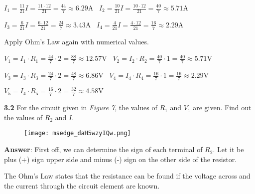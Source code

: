 \documentclass{article}
\begin{document}
{\vspace{4mm}

{\Large $\displaystyle \boxed{I_1 = \frac{11}{21}I = \frac{11\cdot 12}{21} = \frac{44}{7} \approx 6.29 \text{A}}$} \ {\Large $\displaystyle \boxed{I_2 = \frac{10}{21}I = \frac{10\cdot 12}{21} = \frac{40}{7}  \approx 5.71 \text{A}}$}

{\Large $\displaystyle \boxed{I_3 = \frac{6}{21}I = \frac{6\cdot 12}{21} = \frac{24}{7}  \approx 3.43 \text{A}}$} \ {\Large $\displaystyle \boxed{I_4 = \frac{4}{21}I = \frac{4\cdot 12}{21} = \frac{16}{7}  \approx 2.29 \text{A}}$}

\vspace{4mm}

{\Large Apply Ohm's Law again with numerical values.}

\vspace{4mm}

{\Large $\displaystyle \boxed{V_1 = I_1\cdot R_1 = \frac{44}{7} \cdot 2 = \frac{88}{7} \approx 12.57 \text{V}}$} \ {\Large $\displaystyle \boxed{V_2 = I_2\cdot R_2 = \frac{40}{7} \cdot 1 = \frac{40}{7} \approx 5.71 \text{V}}$}

{\Large $\displaystyle \boxed{V_3 = I_3\cdot R_3 = \frac{24}{7} \cdot 2 = \frac{48}{7} \approx 6.86 \text{V}}$} \ {\Large $\displaystyle \boxed{V_4 = I_4\cdot R_4 = \frac{16}{7} \cdot 1 = \frac{16}{7} \approx 2.29 \text{V}}$}

{\Large $\displaystyle \boxed{V_5 = I_4\cdot R_5 = \frac{16}{7} \cdot 2 = \frac{32}{7} \approx 4.58 \text{V}}$}

\vspace{8mm}

{\Large \textbf{3.2} For the circuit given in \textit{Figure 7}, the values of $R_{1}$ and $V_{1}$ are given. Find out the values of $R_{2}$ and $I$.}

\begin{figure}[H]
    \centering
    \texttt{[image: msedge\_daH5wzyIQw.png]}
\end{figure}

{\Large \textbf{Answer}: First off, we can determine the sign of each terminal of $R_{2}$. Let it be plus (+) sign upper side and minus (-) sign on the other side of the resistor.}

{\Large The Ohm's Law states that the resistance can be found if the voltage across and the current through the circuit element are known.}

{\vspace{4mm}}

}
\end{document}

